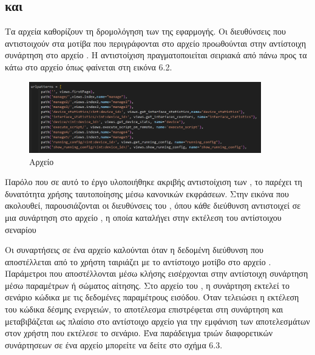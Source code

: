 \subsection{ και }


 Τα αρχεία  καθορίζουν τη δρομολόγηση των  της εφαρμογής. Οι διευθύνσεις  που αντιστοιχούν στα μοτίβα που περιγράφονται στο αρχείο  προωθούνται στην αντίστοιχη συνάρτηση στο αρχείο . Η αντιστοίχιση πραγματοποιείται σειριακά από πάνω προς τα κάτω στο αρχείο  όπως φαίνεται στη εικόνα 6.2. 

\FloatBarrier

\begin{figure}[htb]
	\centering
	\includegraphics[width=0.9\textwidth]{graphics/urlpy.png}
	\caption{Αρχείο  }
\end{figure}

\FloatBarrier

Παρόλο που σε αυτό το έργο υλοποιήθηκε ακριβής αντιστοίχιση των , το  παρέχει τη 
δυνατότητα χρήσης ταυτοποίησης μέσω κανονικών εκφράσεων. Στην εικόνα που ακολουθεί, παρουσιάζονται οι 
διευθύνσεις  του , όπου κάθε διεύθυνση αντιστοιχεί σε μια συνάρτηση στο αρχείο , 
η οποία καταλήγει στην εκτέλεση του αντίστοιχου σεναρίου



Οι συναρτήσεις σε ένα αρχείο  καλούνται όταν η δεδομένη διεύθυνση  που αποστέλλεται από το
χρήστη ταιριάζει με το αντίστοιχο μοτίβο  στο αρχείο . Παράμετροι που αποστέλλονται μέσω κλήσης
 εισέρχονται στην αντίστοιχη συνάρτηση μέσω παραμέτρων ή σώματος αίτησης. Στο αρχείο  του , η συνάρτηση εκτελεί το σενάριο
κώδικα με τις δεδομένες παραμέτρους εισόδου. Όταν τελειώσει η εκτέλεση του κώδικα δέσμης ενεργειών,
το αποτέλεσμα επιστρέφεται στη συνάρτηση  και μεταβιβάζεται ως πλαίσιο στο αντίστοιχο αρχείο  για την εμφάνιση των αποτελεσμάτων στον χρήστη που εκτέλεσε το σενάριο.
Ένα παράδειγμα τριών διαφορετικών συνάρτησεων σε ένα αρχείο  μπορείτε να δείτε στο σχήμα 6.3.

